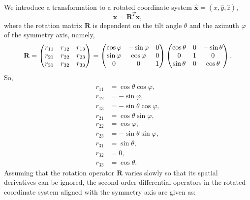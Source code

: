 We introduce a transformation to a rotated coordinate system $\widehat{\mathbf{x}}=(\widehat{x},\widehat{y},\widehat{z})$,
\begin{equation}
\widehat{\mathbf{x}}=\mathbf{R}^{T}\mathbf{x},
\end{equation}
where the rotation matrix $\mathbf{R}$ is dependent on the tilt angle $\theta$ and the azimuth $\varphi$ of the
 symmetry axis, namely,
\begin{equation}
\mathbf{R}=
\begin{pmatrix}r_{11} & r_{12} &r_{13} \cr
         r_{21} & r_{22} &r_{23} \cr
         r_{31} & r_{32} &r_{33}\end{pmatrix}
=\begin{pmatrix}\cos{\varphi} & -\sin{\varphi} &0 \cr
          \sin{\varphi} & \cos{\varphi} &0 \cr
          0 & 0 & 1\end{pmatrix}
\begin{pmatrix}\cos{\theta} & 0 & -\sin{\theta} \cr
          0 & 1 & 0 \cr
          \sin{\theta} & 0 & \cos{\theta}\end{pmatrix}.
\end{equation}
So,
\begin{equation}
\begin{split}
r_{11}&=\cos{\theta}\cos{\varphi}, \\
r_{12}&=-\sin{\varphi}, \\
r_{13}&=-\sin{\theta}\cos{\varphi}, \\
r_{21}&=\cos{\theta}\sin{\varphi}, \\
r_{22}&=\cos{\varphi}, \\
r_{23}&=-\sin{\theta}\sin{\varphi}, \\
r_{31}&=\sin{\theta}, \\
r_{32}&=0, \\
r_{33}&=\cos{\theta}.
\end{split}
\end{equation}
Assuming that the rotation operator $\mathbf{R}$ varies slowly so that its spatial derivatives can be ignored,
the second-order differential operators in the rotated coordinate system aligned with the symmetry axis are given as:
